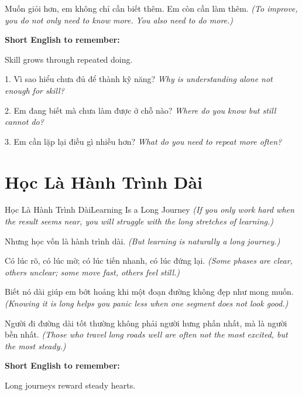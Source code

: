 \begin{baihoc}
Muốn giỏi hơn, em không chỉ cần biết thêm. Em còn cần làm thêm.
\textit{(To improve, you do not only need to know more. You also need to do more.)}
\end{baihoc}

\begin{ghinhoanh}
\textbf{Short English to remember:}

Skill grows through repeated doing.

\end{ghinhoanh}

\begin{tuhocnhanh}
1. Vì sao hiểu chưa đủ để thành kỹ năng? \textit{Why is understanding alone not enough for skill?}

2. Em đang biết mà chưa làm được ở chỗ nào? \textit{Where do you know but still cannot do?}

3. Em cần lặp lại điều gì nhiều hơn? \textit{What do you need to repeat more often?}
\end{tuhocnhanh}
\ngancach

\section{Học Là Hành Trình Dài}
\begin{truyen}{Học Là Hành Trình Dài}{Learning Is a Long Journey}
\textit{(If you only work hard when the result seems near, you will struggle with the long stretches of learning.)}

Nhưng học vốn là hành trình dài.
\textit{(But learning is naturally a long journey.)}

Có lúc rõ, có lúc mờ; có lúc tiến nhanh, có lúc đứng lại.
\textit{(Some phases are clear, others unclear; some move fast, others feel still.)}

Biết nó dài giúp em bớt hoảng khi một đoạn đường không đẹp như mong muốn.
\textit{(Knowing it is long helps you panic less when one segment does not look good.)}
\end{truyen}

\begin{baihoc}
Người đi đường dài tốt thường không phải người hưng phấn nhất, mà là người bền nhất.
\textit{(Those who travel long roads well are often not the most excited, but the most steady.)}
\end{baihoc}

\begin{ghinhoanh}
\textbf{Short English to remember:}

Long journeys reward steady hearts.

\end{ghinhoanh}

